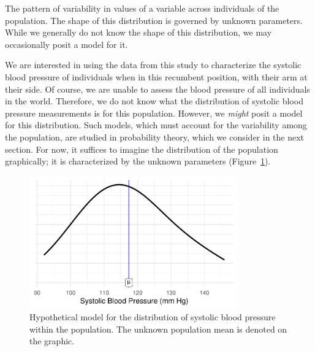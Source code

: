 \documentclass[
  letterpaper,
  DIV=11,
  numbers=noendperiod]{scrreprt}
\theoremstyle{definition}
\theoremstyle{definition}
\theoremstyle{remark}
\begin{document}
\begin{tcolorbox}[enhanced jigsaw, bottomrule=.15mm, titlerule=0mm, bottomtitle=1mm, colback=white, coltitle=black, rightrule=.15mm, leftrule=.75mm, toprule=.15mm, toptitle=1mm, left=2mm, opacityback=0, colframe=quarto-callout-important-color-frame, breakable, title=\textcolor{quarto-callout-important-color}{\faExclamation}\hspace{0.5em}{Distribution of the Population}, arc=.35mm, colbacktitle=quarto-callout-important-color!10!white, opacitybacktitle=0.6]

The pattern of variability in values of a variable across individuals of
the population. The shape of this distribution is governed by unknown
parameters. While we generally do not know the shape of this
distribution, we may occasionally posit a model for it.

\end{tcolorbox}

We are interested in using the data from this study to characterize the
systolic blood pressure of individuals when in this recumbent position,
with their arm at their side. Of course, we are unable to assess the
blood pressure of all individuals in the world. Therefore, we do not
know what the distribution of systolic blood pressure measurements is
for this population. However, we \emph{might} posit a model for this
distribution. Such models, which must account for the variability among
the population, are studied in probability theory, which we consider in
the next section. For now, it suffices to imagine the distribution of
the population graphically; it is characterized by the unknown
parameters (Figure~\ref{fig-distributional-quartet-population}).

\begin{figure}

{\centering \includegraphics[width=0.8\textwidth,height=\textheight]{./images/fig-distributional-quartet-population-1.pdf}

}

\caption{\label{fig-distributional-quartet-population}Hypothetical model
for the distribution of systolic blood pressure within the population.
The unknown population mean is denoted on the graphic.}

\end{figure}
\end{document}
